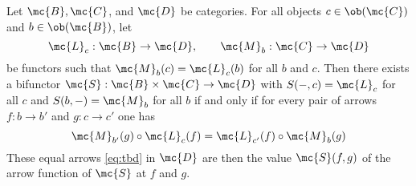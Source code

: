 \documentclass[nocover]{pset}
\begin{document}
\begin{adjustwidth}{1em}{1em}
\begin{theorem}
    Let $\mc{B}, \mc{C}$, and $\mc{D}$ be categories. For all objects
    $c \in \ob(\mc{C})$ and $b \in \ob(\mc{B})$, let
    \[
      \mc{L}_{c} : \mc{B} \to \mc{D}, \qquad \mc{M}_b : \mc{C} \to
      \mc{D}
    \]
    be functors such that $\mc{M}_b(c) = \mc{L}_c(b)$ for all $b$ and
    $c$. Then there exists a bifunctor $\mc{S} : \mc{B} \times \mc{C}
    \to \mc{D}$ with $S(-, c) = \mc{L}_c$ for all $c$ and $S(b, -) =
    \mc{M}_b$ for all $b$ if and only if for every pair of arrows $f :
    b \to b'$ and $g : c \to c'$ one has
    \begin{equation}
      \mc{M}_{b'}(g) \circ \mc{L}_c(f) = \mc{L}_{c'}(f) \circ
      \mc{M}_b(g) \label{eq:tbd}
    \end{equation}
    These equal arrows \ref{eq:tbd} in $\mc{D}$ are then the value
    $\mc{S}(f,g)$ of the arrow function of $\mc{S}$ at $f$ and $g$.
  \end{theorem}
\end{adjustwidth}
\end{document}
